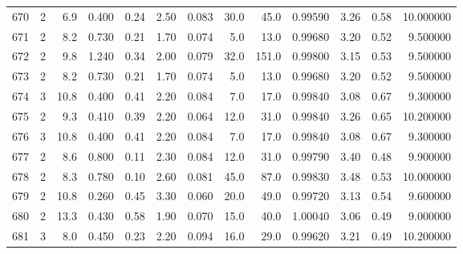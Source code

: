 \begin{tabular}{lrrrrrrrrrrrr}
670  &        2 &            6.9 &             0.400 &         0.24 &            2.50 &      0.083 &                 30.0 &                  45.0 &  0.99590 &  3.26 &       0.58 &  10.000000 \\
671  &        2 &            8.2 &             0.730 &         0.21 &            1.70 &      0.074 &                  5.0 &                  13.0 &  0.99680 &  3.20 &       0.52 &   9.500000 \\
672  &        2 &            9.8 &             1.240 &         0.34 &            2.00 &      0.079 &                 32.0 &                 151.0 &  0.99800 &  3.15 &       0.53 &   9.500000 \\
673  &        2 &            8.2 &             0.730 &         0.21 &            1.70 &      0.074 &                  5.0 &                  13.0 &  0.99680 &  3.20 &       0.52 &   9.500000 \\
674  &        3 &           10.8 &             0.400 &         0.41 &            2.20 &      0.084 &                  7.0 &                  17.0 &  0.99840 &  3.08 &       0.67 &   9.300000 \\
675  &        2 &            9.3 &             0.410 &         0.39 &            2.20 &      0.064 &                 12.0 &                  31.0 &  0.99840 &  3.26 &       0.65 &  10.200000 \\
676  &        3 &           10.8 &             0.400 &         0.41 &            2.20 &      0.084 &                  7.0 &                  17.0 &  0.99840 &  3.08 &       0.67 &   9.300000 \\
677  &        2 &            8.6 &             0.800 &         0.11 &            2.30 &      0.084 &                 12.0 &                  31.0 &  0.99790 &  3.40 &       0.48 &   9.900000 \\
678  &        2 &            8.3 &             0.780 &         0.10 &            2.60 &      0.081 &                 45.0 &                  87.0 &  0.99830 &  3.48 &       0.53 &  10.000000 \\
679  &        2 &           10.8 &             0.260 &         0.45 &            3.30 &      0.060 &                 20.0 &                  49.0 &  0.99720 &  3.13 &       0.54 &   9.600000 \\
680  &        2 &           13.3 &             0.430 &         0.58 &            1.90 &      0.070 &                 15.0 &                  40.0 &  1.00040 &  3.06 &       0.49 &   9.000000 \\
681  &        3 &            8.0 &             0.450 &         0.23 &            2.20 &      0.094 &                 16.0 &                  29.0 &  0.99620 &  3.21 &       0.49 &  10.200000 \\

\end{tabular}
